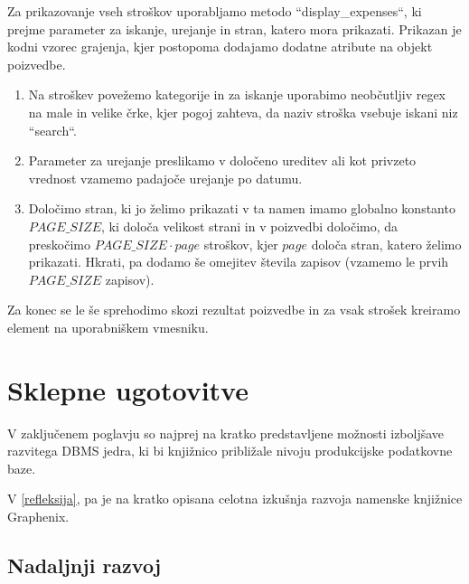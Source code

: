 \documentclass[a4paper,12pt,openright]{book}
\begin{document}
    \noindent
    Za prikazovanje vseh stroškov uporabljamo metodo ``display\_expenses``, ki prejme parameter za iskanje, urejanje in stran, katero mora prikazati. Prikazan je kodni vzorec grajenja, kjer postopoma dodajamo dodatne atribute na objekt poizvedbe. 
    \begin{enumerate}
        \item Na stroškev povežemo kategorije in za iskanje uporabimo neobčutljiv regex na male in velike črke, kjer pogoj zahteva, da naziv stroška vsebuje iskani niz ``search``.
        \item Parameter za urejanje preslikamo v določeno ureditev ali kot privzeto vrednost vzamemo padajoče urejanje po datumu.
        \item Določimo stran, ki jo želimo prikazati v ta namen imamo globalno konstanto $PAGE\_SIZE$, ki določa velikost strani in v poizvedbi določimo, da preskočimo $PAGE\_SIZE \cdot page$ stroškov, kjer $page$ določa stran, katero želimo prikazati. Hkrati, pa dodamo še omejitev števila zapisov (vzamemo le prvih $PAGE\_SIZE$ zapisov).
    \end{enumerate}

    \noindent
    Za konec se le še sprehodimo skozi rezultat poizvedbe in za vsak strošek kreiramo element na uporabniškem vmesniku.
    

\chapter{Sklepne ugotovitve}
    
    V zaključenem poglavju so najprej na kratko predstavljene možnosti izboljšave razvitega DBMS jedra, ki bi knjižnico približale nivoju produkcijske podatkovne baze.

    V \ref{refleksija}, pa je na kratko opisana celotna izkušnja razvoja namenske knjižnice Graphenix.
    
    \section{Nadaljnji razvoj}
\end{document}
